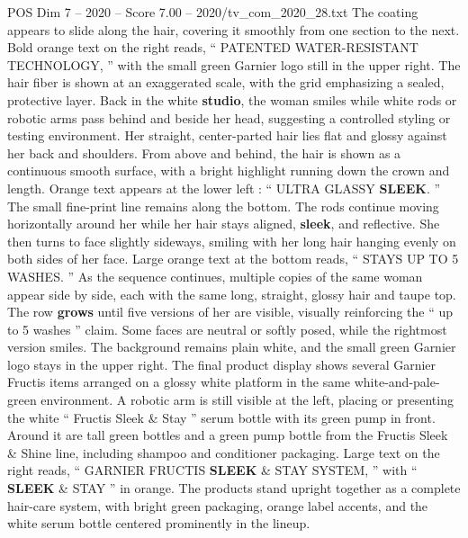 \begin{textsample}{POS Dim 7 – 2020 – Score 7.00 – 2020/tv\_com\_2020\_28.txt}
The coating appears to slide along the hair, covering it smoothly from one section to the next.
Bold orange text on the right reads, “ PATENTED WATER-RESISTANT TECHNOLOGY, ” with the small green Garnier logo still in the upper right.
The hair fiber is shown at an exaggerated scale, with the grid emphasizing a sealed, protective layer.
Back in the white \textbf{studio}, the woman smiles while white rods or robotic arms pass behind and beside her head, suggesting a controlled styling or testing environment.
Her straight, center-parted hair lies flat and glossy against her back and shoulders.
From above and behind, the hair is shown as a continuous smooth surface, with a bright highlight running down the crown and length.
Orange text appears at the lower left : “ ULTRA GLASSY \textbf{SLEEK}. ” The small fine-print line remains along the bottom.
The rods continue moving horizontally around her while her hair stays aligned, \textbf{sleek}, and reflective.
She then turns to face slightly sideways, smiling with her long hair hanging evenly on both sides of her face.
Large orange text at the bottom reads, “ STAYS UP TO 5 WASHES. ” As the sequence continues, multiple copies of the same woman appear side by side, each with the same long, straight, glossy hair and taupe top.
The row \textbf{grows} until five versions of her are visible, visually reinforcing the “ up to 5 washes ” claim.
Some faces are neutral or softly posed, while the rightmost version smiles.
The background remains plain white, and the small green Garnier logo stays in the upper right.
The final product display shows several Garnier Fructis items arranged on a glossy white platform in the same white-and-pale-green environment.
A robotic arm is still visible at the left, placing or presenting the white “ Fructis Sleek \& Stay ” serum bottle with its green pump in front.
Around it are tall green bottles and a green pump bottle from the Fructis Sleek \& Shine line, including shampoo and conditioner packaging.
Large text on the right reads, “ GARNIER FRUCTIS \textbf{SLEEK} \& STAY SYSTEM, ” with “ \textbf{SLEEK} \& STAY ” in orange.
The products stand upright together as a complete hair-care system, with bright green packaging, orange label accents, and the white serum bottle centered prominently in the lineup.

\end{textsample}
